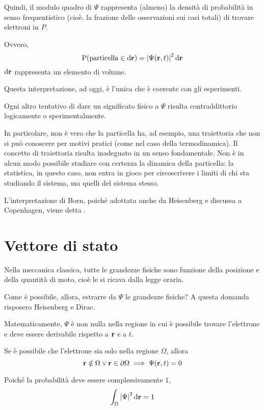 Quindi, il modulo quadro di $\Psi$ rappresenta (almeno) la densità di probabilità in senso frequentistico (cioè, la frazione delle osservazioni sui casi totali) di trovare elettroni in $P$.

Ovvero,
\begin{equation}
    \mathrm{P}(\text{particella} \in \mathrm{d}\mathbf{r}) = \left\lvert \Psi(\mathbf{r}, t) \right\rvert^2 \mathrm{d}\mathbf{r}
\end{equation}
$\mathrm{d}\mathbf{r}$ rappresenta un elemento di volume.

Questa interpretazione, ad oggi, è l'unica che è coerente con gli esperimenti.

Ogni altro tentativo di dare un significato fisico a $\Psi$ risulta contraddittorio logicamente o sperimentalmente.

In particolare, non è vero che la particella ha, ad esempio, una traiettoria che non si può conoscere per motivi pratici (come nel caso della termodinamica).
Il concetto di traiettoria risulta inadeguato in un senso fondamentale.
Non è in alcun modo possibile studiare con certezza la dinamica della particella: la statistica, in questo caso, non entra in gioco per circoscrivere i limiti di chi sta studiando il sistema, ma quelli del sistema stesso.

L'interpretazione di Born, poiché adottata anche da Heisenberg e discussa a Copenhagen, viene detta .


\section{Vettore di stato}

Nella meccanica classica, tutte le grandezze fisiche sono funzione della posizione e della quantità di moto, cioè le si ricava dalla legge oraria.

Come è possibile, allora, estrarre da $\Psi$ le grandezze fisiche?
A questa domanda risposero Heisenberg e Dirac.

Matematicamente, $\Psi$ è non nulla nella regione in cui è possibile trovare l'elettrone e deve essere derivabile rispetto a $\mathbf{r}$ e a $t$.

Se è possibile che l'elettrone sia solo nella regione $\Omega$, allora
\begin{equation}
    \mathbf{r} \notin \Omega \lor \mathbf{r} \in \partial \Omega \implies \Psi(\mathbf{r}, t) = 0
\end{equation}

Poiché la probabilità deve essere complessivamente $1$,
\begin{equation}
    \int_\Omega \left\lvert \Psi \right\rvert^2 \mathrm{d}\mathbf{r} = 1
\end{equation}

